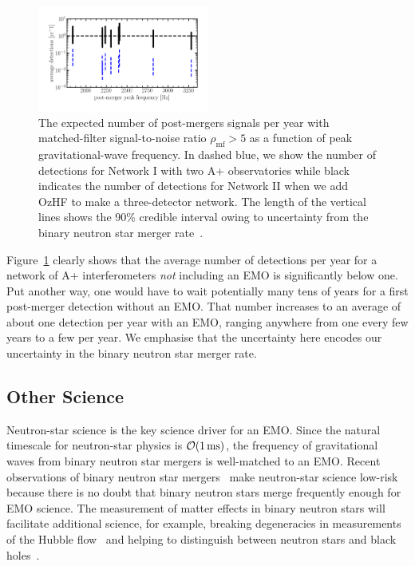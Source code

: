 \documentclass[prx,superscriptaddress,twocolumn,nopreprintnumbers,floatfix,nofootinbib]{revtex4}
\begin{document}
\begin{figure}[htb]
\centering
\includegraphics[width=0.5\textwidth]{post_merger_rate.png}
\caption{The expected number of post-mergers signals per year with matched-filter signal-to-noise ratio $\rho_\text{mf}>5$ as a function of peak gravitational-wave frequency.
In dashed blue, we show the number of detections for Network I with two A+ observatories while black indicates the number of detections for Network II when we add OzHF to make a three-detector network.
The length of the vertical lines shows the 90\% credible interval owing to uncertainty from the binary neutron star merger rate~\cite{GW190425}.}
\label{fig:ndet}
\end{figure}

Figure~\ref{fig:ndet} clearly shows that the average number of detections per year for a network of A+ interferometers \textit{not} including an EMO is significantly below one.  Put another way, one would have to wait potentially many tens of years for a first post-merger detection without an EMO.  That number increases to an average of about one detection per year with an EMO, ranging anywhere from one every few years to a few per year.  We emphasise that the uncertainty here encodes our uncertainty in the binary neutron star merger rate.


\subsection{Other Science}
Neutron-star science is the key science driver for an EMO.
Since the natural timescale for neutron-star physics is ${\cal O}(\unit[1]{ms})$, the frequency of gravitational waves from binary neutron star mergers is well-matched to an EMO.
Recent observations of binary neutron star mergers~\cite{abbott17_gw170817_detection, GW190425} make neutron-star science low-risk because there is no doubt that binary neutron stars merge frequently enough for EMO science.
The measurement of matter effects in binary neutron stars will facilitate additional science, for example, breaking degeneracies in measurements of the Hubble flow~\cite{messenger12} and helping to distinguish between neutron stars and black holes~\cite[e.g.,][]{fasano20}.
\end{document}
